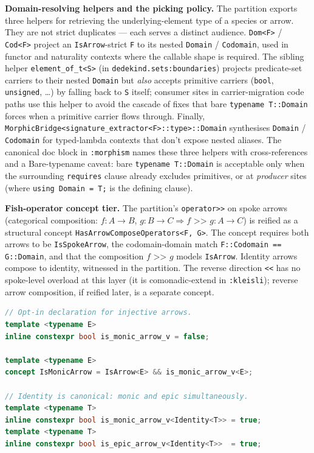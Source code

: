 \documentclass[11pt, a4paper]{report}
\begin{document}
\textbf{Domain-resolving helpers and the picking policy.} The partition exports three helpers for retrieving the underlying-element type of a species or arrow. They are not strict duplicates --- each serves a distinct audience. \texttt{Dom<F>} / \texttt{Cod<F>} project an \texttt{IsArrow}-strict \texttt{F} to its nested \texttt{Domain} / \texttt{Codomain}, used in functor and naturality contexts where the callable shape is required. The sibling helper \texttt{element\_of\_t<S>} (in \texttt{dedekind.sets:boundaries}) projects predicate-set carriers to their nested \texttt{Domain} but \emph{also} accepts primitive carriers (\texttt{bool}, \texttt{unsigned}, \ldots) by falling back to \texttt{S} itself; consumer sites in carrier-migration code paths use this helper to avoid the cascade of fixes that bare \texttt{typename T::Domain} forces when a primitive carrier flows through. Finally, \texttt{MorphicBridge<signature\_extractor<F>::type>::Domain} synthesises \texttt{Domain} / \texttt{Codomain} for typed-lambda contexts that don't expose nested aliases. The canonical doc block in \texttt{:morphism} names these three helpers with cross-references and a Bare-typename caveat: bare \texttt{typename T::Domain} is acceptable only when the surrounding \texttt{requires} clause already excludes primitives, or at \emph{producer} sites (where \texttt{using Domain = T;} is the defining clause).

\textbf{Fish-operator concept tier.} The partition's \texttt{operator>>} on spoke arrows (categorical composition: $f : A \to B$, $g : B \to C \Rightarrow f \texttt{ >> } g : A \to C$) is reified as a structural concept \texttt{HasArrowComposeOperators<F, G>}. The concept requires both arrows to be \texttt{IsSpokeArrow}, the codomain-domain match \texttt{F::Codomain == G::Domain}, and that the composition $f \texttt{ >> } g$ models \texttt{IsArrow}. Identity arrows compose to identity, witnessed in the partition. The reverse direction \texttt{<<} has no spoke-level overload at this layer (it is comonadic-extend in \texttt{:kleisli}); reverse arrow composition, if reified later, is a separate concept.

\begin{lstlisting}[language=C++, caption={Monic and epic arrow concepts (from \texttt{morphism.cppm}).}, label={lst:monic-epic}]
// Opt-in declaration for injective arrows.
template <typename E>
inline constexpr bool is_monic_arrow_v = false;

template <typename E>
concept IsMonicArrow = IsArrow<E> && is_monic_arrow_v<E>;

// Identity is canonical: monic and epic simultaneously.
template <typename T>
inline constexpr bool is_monic_arrow_v<Identity<T>> = true;
template <typename T>
inline constexpr bool is_epic_arrow_v<Identity<T>>  = true;
\end{lstlisting}
\end{document}
